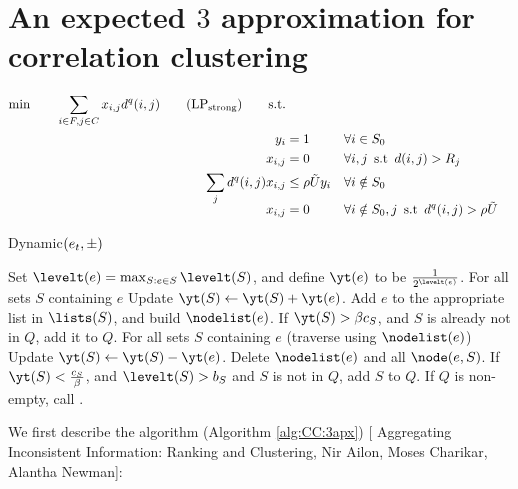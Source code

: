 
\section{An expected $3$ approximation for correlation clustering}

	\begin{align}
		\min \qquad \sum_{i \in F, j \in C}x_{i, j} d^q(i, j) \tag{$\text{LP}_{\text{strong}}$} \qquad  \label{LP:strong}
	\text{s.t.} \\
		y_i &= 1 & & \forall i \in S_0 &\label{LPs:S0}\\
		 x_{i,j} &= 0 & &\forall i, j \, \text { s.t } \, d(i,j) >  R_j & \label{LPs:R} \\
	    \sum_{j} d^q(i,j) x_{i,j} & \leq \rho \tilde U y_i & & \forall i \notin S_0 & \label{LPs:star} \\[-6pt]
	    x_{i,j} &= 0 & &\forall i \notin S_0, j \, \text { s.t } \, d^q(i,j) >  \rho \tilde U &\label{LPs:R-d}
	\end{align}




\begin{algorithm}
\caption{{\sf Dynamic}$(e_{t}, \pm)$}
\label{alg:dynamicf}
\begin{algorithmic}[1]
\State  Set $\levelt(e) = \max_{S:e \in S} \levelt(S)$, and define $\yt(e)$ to be $\frac{1}{2^{\levelt(e)}}$.
\State  For all sets $S$ containing $e$
\State \spc Update $\yt(S) \leftarrow \yt(S) + \yt(e)$.
\State \spc Add $e$ to the appropriate list in $\lists(S)$, and build $\nodelist(e)$.
\State\spc  If $\yt(S) > \beta  c_S$, and $S$ is already not in $Q$, add it to $Q$.
\State For all sets $S$ containing $e$ (traverse using $\nodelist(e)$)
\State  \spc Update $\yt(S) \leftarrow \yt(S) - \yt(e)$.
\State \spc Delete  $\nodelist(e)$ and all $\node(e,S)$.
\State \spc If $\yt(S) < \frac{c_S}{\beta}$, and $\levelt(S) > b_S$ and $S$ is not in $Q$, add $S$ to $Q$.
\EndIf
\State If $Q$ is non-empty, call \FIX.
\end{algorithmic}
\end{algorithm}




We first describe the algorithm (Algorithm \ref{alg:CC:3apx}) [{\color{red} Aggregating Inconsistent Information: Ranking and Clustering, Nir Ailon, Moses Charikar, Alantha Newman}]:

